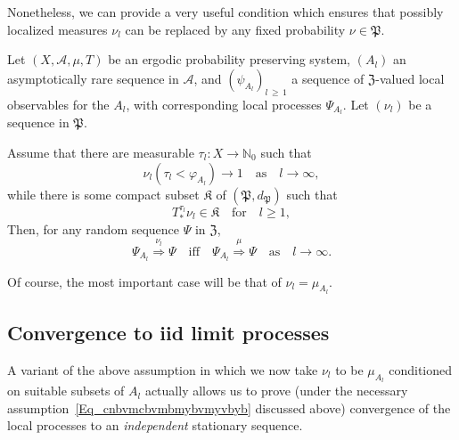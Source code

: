 \documentclass[AHL,Unicode,longabstracts]{cedram}
\newcommand{\clA}{\mathcal{A}}
\newcommand{\frkK}{\mathfrak{K}}
\newcommand{\frkP}{\mathfrak{P}}
\newcommand{\frkZ}{\mathfrak{Z}}
\newcommand{\bbN}{\mathbb{N}}
\begin{document}
Nonetheless, we can provide a very useful condition which ensures that possibly localized measures $\nu_{l}$ can be replaced by any fixed probability $\nu\in\frkP$.

\begin{theo}\label{T_AsyIntStateProc}
Let $(X,\clA,\mu,T)$ be an ergodic probability preserving system, $(A_{l})$ an asymptotically rare sequence in $\clA$, and $(\psi_{A_{l}})_{l\,\geq\,1}$ a sequence of $\frkZ $-valued local observables for the $A_{l}$, with corresponding local processes $\Psi_{A_{l}}$. Let $(\nu_{l})$ be a sequence in $\frkP$.

Assume that there are measurable $\tau_{l}:X\rightarrow\bbN_{0}$ such that
\begin{equation}\label{Eq_hghghghgghghghghdhsf}
\nu_{l}\left(\tau_{l}<\varphi_{A_{l}}\right) \longrightarrow1\quad\text{as}\quad l\rightarrow\infty,
\end{equation}
while there is some compact subset $\frkK$ of $(\frkP,d_{\frkP})$ such that
\begin{equation}\label{Eq_cxdcdsewvxvxwfrvxsf}
T_{\ast}^{\tau_{l}}\nu_{l}\in\frkK \quad \text{for}\quad l\geq1,
\end{equation}
Then, for any random sequence $\Psi$ in $\frkZ$,
\begin{equation}
\Psi_{A_{l}}\overset{\nu_{l}}{\Longrightarrow}\Psi\quad \text{iff}\quad
\Psi_{A_{l}}\overset{\mu}{\Longrightarrow}\Psi\quad \text{as}\quad l\rightarrow
\infty.
\end{equation}
\end{theo}

Of course, the most important case will be that of $\nu_{l}=\mu_{A_{l}}$.


\subsection{Convergence to iid limit processes}
A variant of the above assumption in which we now take $\nu_{l}$ to be $\mu_{A_{l}}$ conditioned on suitable subsets of $A_{l}$ actually allows us to prove (under the necessary assumption~\eqref{Eq_cnbvmcbvmbmybvmyvbyb} discussed above) convergence of the local processes to an \emph{independent} stationary sequence.
\end{document}

